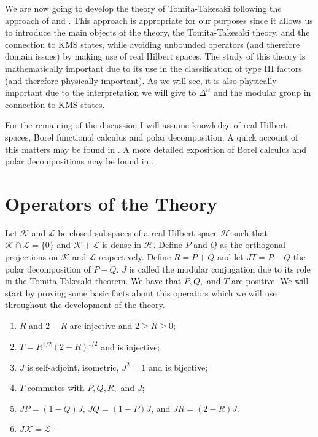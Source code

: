 We are now going to develop the theory of Tomita-Takesaki following the approach of \cite{Duvenhage1999} and \cite{Rieffel1977}. This approach is appropriate for our purposes since it allows us to introduce the main objects of the theory, the Tomita-Takesaki theory, and the connection to KMS states, while avoiding unbounded operators (and therefore domain issues) by making use of real Hilbert spaces. The study of this theory is mathematically important due to its use in the classification of type III factors (and therefore physically important). As we will see, it is also physically important due to the interpretation we will give to $\Delta^{it}$ and the modular group in connection to KMS states.

For the remaining of the discussion I will assume knowledge of real Hilbert spaces, Borel functional calculus and polar decomposition. A quick account of this matters may be found in \cite{Duvenhage1999}. A more detailed exposition of Borel calculus and polar decompositions may be found in \cite{Rudin1991}.

\section{Operators of the Theory}

Let $\mathcal{K}$ and $\mathcal{L}$ be closed subspaces of a real Hilbert space $\mathcal{H}$ such that $\mathcal{K}\cap\mathcal{L}=\{0\}$ and $\mathcal{K}+\mathcal{L}$ is dense in $\mathcal{H}$. Define $P$ and $Q$ as the orthogonal projections on $\mathcal{K}$ and $\mathcal{L}$ respectively. Define $R=P+Q$ and let $JT=P-Q$ the polar decomposition of $P-Q$. $J$ is called the modular conjugation due to its role in the Tomita-Takesaki theorem. We have that $P,Q,$ and $T$ are positive. We will start by proving some basic facts about this operators which we will use throughout the development of the theory.

\begin{theorem}
\begin{enumerate}
\item $R$ and $2-R$ are injective and $2\geq R \geq 0$;
\item $T=R^{1/2}(2-R)^{1/2}$ and is injective;
\item $J$ is self-adjoint, isometric, $J^2=1$ and is bijective;
\item $T$ commutes with $P,Q,R,$ and $J$;
\item $JP=(1-Q)J$, $JQ=(1-P)J$, and $JR=(2-R)J$.
\item $J\mathcal{K}=\mathcal{L}^\bot$
\end{enumerate}
\end{theorem}

